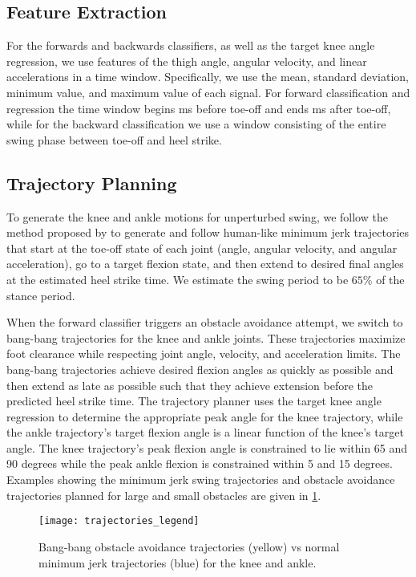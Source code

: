\subsection{Feature Extraction}
For the forwards and backwards classifiers, as well as the target knee angle
regression, we use features of the thigh angle, angular velocity, and linear
accelerations in a time window. Specifically, we use the mean, standard
deviation, minimum value, and maximum value of each signal. For forward
classification and regression the time window begins \unit[210]{ms} before
toe-off and ends \unit[90]{ms} after toe-off, while for the backward
classification we use a window consisting of the entire swing phase between
toe-off and heel strike.

\subsection{Trajectory Planning}

To generate the knee and ankle motions for unperturbed swing, we follow the
method proposed by \citet{lenzi2014speed} to generate and follow human-like
minimum jerk trajectories that start at the toe-off state of each joint (angle,
angular velocity, and angular acceleration), go to a target flexion state, and
then extend to desired final angles at the estimated heel strike time. We
estimate the swing period to be $65\%$ of the stance period.

When the forward classifier triggers an obstacle avoidance attempt, we switch to
bang-bang trajectories for the knee and ankle joints. These trajectories
maximize foot clearance while respecting joint angle, velocity, and acceleration
limits. The bang-bang trajectories achieve desired flexion angles as quickly as
possible and then extend as late as possible such that they achieve extension
before the predicted heel strike time. The trajectory planner uses the target
knee angle regression to determine the appropriate peak angle for the knee
trajectory, while the ankle trajectory's target flexion angle is a linear
function of the knee's target angle. The knee trajectory's peak flexion angle is
constrained to lie within 65 and 90 degrees while the peak ankle flexion is
constrained within 5 and 15 degrees. Examples showing the minimum jerk swing
trajectories and obstacle avoidance trajectories planned for large and small
obstacles are given in \cref{fig:avoid_trajs}.

\begin{figure}[tb]
\centerline{\texttt{[image: trajectories\_legend]}}
\caption[Bang-bang obstacle avoidance and minimum jerk swing
trajectories]{Bang-bang obstacle avoidance trajectories (yellow) vs normal
minimum jerk trajectories (blue) for the knee and ankle.}\label{fig:avoid_trajs}
\end{figure}

